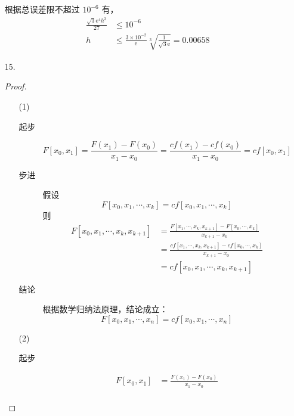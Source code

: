 \documentclass{sjtuarticle}
\begin{document}
\begin{itemize}
\begin{solution}
\begin{equation*}
        \end{equation*}
        根据总误差限不超过 $10^{-6}$ 有，
        \begin{align*}
            \frac{\sqrt{3}\mathrm{e}^4h^3}{27}&\leq 10^{-6}\\
            h&\leq \frac{3\times 10^{-2}}{\mathrm{e}}\sqrt[3]{\frac{1}{\sqrt{3}\mathrm{e}}}=0.00658
        \end{align*}
    \end{solution}
    \item[15.] \begin{proof}
        \begin{itemize}
            \item[(1)] \begin{description}
                \item[起步] \begin{equation*}
                    F[x_0,x_1]=\frac{F(x_1)-F(x_0)}{x_1-x_0}=\frac{cf(x_1)-cf(x_0)}{x_1-x_0}=cf[x_0,x_1]
                \end{equation*}
                \item[步进] 假设
                \begin{equation*}
                    F[x_0,x_1,\cdots,x_k] = cf[x_0,x_1,\cdots,x_k]
                \end{equation*}
                则
                \begin{align*}
                    F[x_0,x_1,\cdots,x_k,x_{k+1}]&=\frac{F[x_1,\cdots,x_k,x_{k+1}]-F[x_0,\cdots,x_k]}{x_{k+1}-x_0}\\
                    &=\frac{cf[x_1,\cdots,x_k,x_{k+1}]-cf[x_0,\cdots,x_k]}{x_{k+1}-x_0}\\&=cf[x_0,x_1,\cdots,x_k,x_{k+1}]
                \end{align*}
                \item[结论] 根据数学归纳法原理，结论成立：
                \begin{equation}\label{eq:cf}
                    F[x_0,x_1,\cdots,x_n]=cf[x_0,x_1,\cdots,x_n]
                \end{equation}
            \end{description}
            \item[(2)] \begin{description}
                \item[起步] \begin{align*}
                    F[x_0,x_1]&=\frac{F(x_1)-F(x_0)}{x_1-x_0}\\

\end{align*}
\end{description}
\end{itemize}
\end{proof}
\end{itemize}
\end{document}
